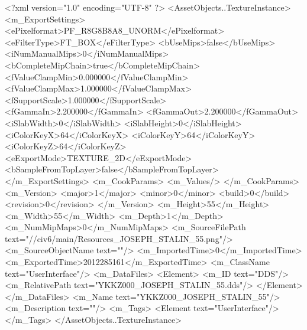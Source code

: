 <?xml version="1.0" encoding="UTF-8" ?>
<AssetObjects..TextureInstance>
	<m_ExportSettings>
		<ePixelformat>PF_R8G8B8A8_UNORM</ePixelformat>
		<eFilterType>FT_BOX</eFilterType>
		<bUseMips>false</bUseMips>
		<iNumManualMips>0</iNumManualMips>
		<bCompleteMipChain>true</bCompleteMipChain>
		<fValueClampMin>0.000000</fValueClampMin>
		<fValueClampMax>1.000000</fValueClampMax>
		<fSupportScale>1.000000</fSupportScale>
		<fGammaIn>2.200000</fGammaIn>
		<fGammaOut>2.200000</fGammaOut>
		<iSlabWidth>0</iSlabWidth>
		<iSlabHeight>0</iSlabHeight>
		<iColorKeyX>64</iColorKeyX>
		<iColorKeyY>64</iColorKeyY>
		<iColorKeyZ>64</iColorKeyZ>
		<eExportMode>TEXTURE_2D</eExportMode>
		<bSampleFromTopLayer>false</bSampleFromTopLayer>
	</m_ExportSettings>
	<m_CookParams>
		<m_Values/>
	</m_CookParams>
	<m_Version>
		<major>1</major>
		<minor>0</minor>
		<build>0</build>
		<revision>0</revision>
	</m_Version>
	<m_Height>55</m_Height>
	<m_Width>55</m_Width>
	<m_Depth>1</m_Depth>
	<m_NumMipMaps>0</m_NumMipMaps>
	<m_SourceFilePath text="//civ6/main/Resources_JOSEPH_STALIN_55.png"/>
	<m_SourceObjectName text=""/>
	<m_ImportedTime>0</m_ImportedTime>
	<m_ExportedTime>2012285161</m_ExportedTime>
	<m_ClassName text="UserInterface"/>
	<m_DataFiles>
		<Element>
			<m_ID text="DDS"/>
			<m_RelativePath text="YKKZ000_JOSEPH_STALIN_55.dds"/>
		</Element>
	</m_DataFiles>
	<m_Name text="YKKZ000_JOSEPH_STALIN_55"/>
	<m_Description text=""/>
	<m_Tags>
		<Element text="UserInterface"/>
	</m_Tags>
</AssetObjects..TextureInstance>

